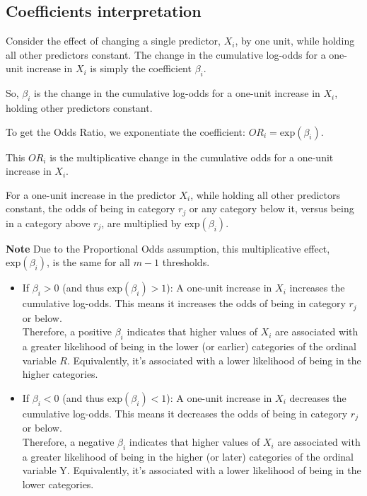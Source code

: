 \documentclass[
  letterpaper,
  DIV=11,
  numbers=noendperiod]{scrartcl}
\begin{document}
\hypertarget{coefficients-interpretation}{%
\subsection{Coefficients
interpretation}\label{coefficients-interpretation}}

Consider the effect of changing a single predictor, \(X_i\), by one
unit, while holding all other predictors constant. The change in the
cumulative log-odds for a one-unit increase in \(X_i\) is simply the
coefficient \(\beta_i\).

So, \(\beta_i\) is the change in the cumulative log-odds for a one-unit
increase in \(X_i\), holding other predictors constant.

To get the Odds Ratio, we exponentiate the coefficient:
\(OR_i = \text{exp}(\beta_i)\).

This \(OR_i\) is the multiplicative change in the cumulative odds for a
one-unit increase in \(X_i\).

For a one-unit increase in the predictor \(X_i\), while holding all
other predictors constant, the odds of being in category \(r_j\) or any
category below it, versus being in a category above \(r_j\), are
multiplied by \(\text{exp}(\beta_i)\).

\textbf{Note} Due to the Proportional Odds assumption, this
multiplicative effect, \(\text{exp}(\beta_i)\), is the same for all
\(m-1\) thresholds.

\begin{itemize}
\item
  If \(\beta_i > 0\) (and thus \(\text{exp}(\beta_i)>1\)): A one-unit
  increase in \(X_i\) increases the cumulative log-odds. This means it
  increases the odds of being in category \(r_j\) or below.\\
  Therefore, a positive \(\beta_i\) indicates that higher values of
  \(X_i\) are associated with a greater likelihood of being in the lower
  (or earlier) categories of the ordinal variable \(R\). Equivalently,
  it's associated with a lower likelihood of being in the higher
  categories.
\item
  If \(\beta_i <0\) (and thus \(\text{exp}(\beta_i)<1\)): A one-unit
  increase in \(X_i\) decreases the cumulative log-odds. This means it
  decreases the odds of being in category \(r_j\) or below.\\
  Therefore, a negative \(\beta_i\) indicates that higher values of
  \(X_i\) are associated with a greater likelihood of being in the
  higher (or later) categories of the ordinal variable Y. Equivalently,
  it's associated with a lower likelihood of being in the lower
  categories.
\end{itemize}
\end{document}
